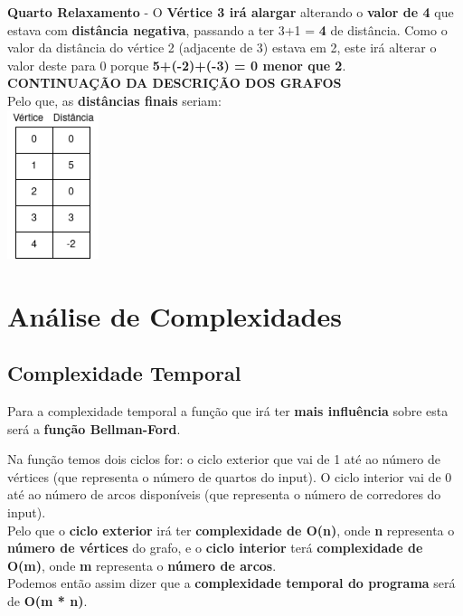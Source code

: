 \documentclass[11pt]{article}   %
\begin{document}
\textbf{Quarto Relaxamento} - O \textbf{Vértice 3 irá alargar} alterando o \textbf{valor de 4} que estava com \textbf{distância negativa}, passando a ter 3+1 = \textbf{4} de distância. Como o valor da distância do vértice 2 (adjacente de 3) estava em 2, este irá alterar o valor deste para 0 porque \textbf{5+(-2)+(-3) = 0 menor que 2}.\\[3cm]
\large\textbf{CONTINUAÇÃO DA DESCRIÇÃO DOS GRAFOS}\\[0.5cm]
Pelo que, as \textbf{distâncias finais} seriam:\\[0.5cm]
\includegraphics[width=0.2\textwidth]{images/quadro_dists_final.png}\\
\section{Análise de Complexidades}
\subsection{Complexidade Temporal}
\hspace{0,5cm}Para a complexidade temporal a função que irá ter \textbf{mais influência} sobre esta será a \textbf{função Bellman-Ford}.

Na função temos dois ciclos for: o ciclo exterior que vai de 1 até ao número de vértices (que representa o número de quartos do input). O ciclo interior vai de 0 até ao número de arcos disponíveis (que representa o número de corredores do input).\\[0cm]

Pelo que o \textbf{ciclo exterior} irá ter \textbf{complexidade de O(n)}, onde \textbf{n} representa o \textbf{número de vértices} do grafo, e o \textbf{ciclo interior} terá \textbf{complexidade de O(m)}, onde \textbf{m} representa o \textbf{número de arcos}.\\

Podemos então assim dizer que a \textbf{complexidade temporal do programa} será de \textbf{O(m * n)}.\\
\end{document}
